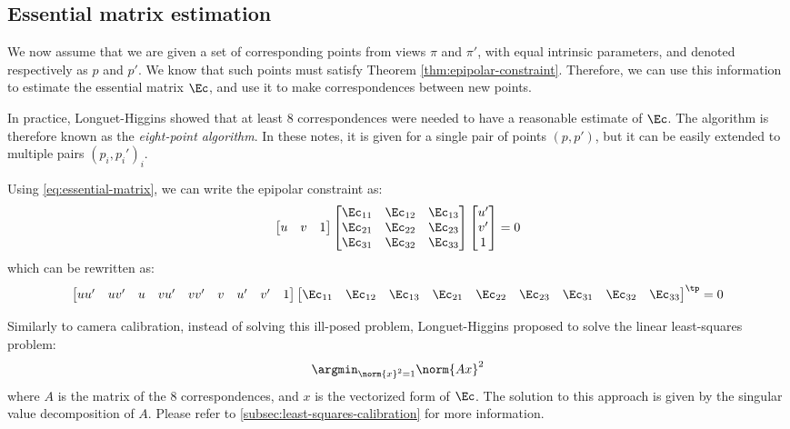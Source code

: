 \subsection{Essential matrix estimation}
We now assume that we are given a set of corresponding points from views $\pi$ and $\pi'$, with equal intrinsic parameters, and denoted respectively as $p$ and $p'$. We know that such points must satisfy Theorem \ref{thm:epipolar-constraint}. Therefore, we can use this information to estimate the essential matrix $\Ec$, and use it to make correspondences between new points.

\begin{remark}
    In practice, Longuet-Higgins showed that at least 8 correspondences were needed to have a reasonable estimate of $\Ec$. The algorithm is therefore known as the \emph{eight-point algorithm}. In these notes, it is given for a single pair of points $(p,p')$, but it can be easily extended to multiple pairs $(p_i,p_i')_i$.
\end{remark}

Using \autoref{eq:essential-matrix}, we can write the epipolar constraint as:
\begin{equation}
    \begin{bmatrix}u&v&1\end{bmatrix}
    \begin{bmatrix}
        \Ec_{11} & \Ec_{12} & \Ec_{13} \\
        \Ec_{21} & \Ec_{22} & \Ec_{23} \\
        \Ec_{31} & \Ec_{32} & \Ec_{33}
    \end{bmatrix}
    \begin{bmatrix}u'\\v'\\1\end{bmatrix}=0
\end{equation}
which can be rewritten as:
\begin{equation*}
    \begin{bmatrix}
        uu' & uv' & u & vu' & vv' & v & u' & v' & 1
    \end{bmatrix}
    \begin{bmatrix}
        \Ec_{11} & \Ec_{12} & \Ec_{13} & \Ec_{21} & \Ec_{22} & \Ec_{23} & \Ec_{31} & \Ec_{32} & \Ec_{33}
    \end{bmatrix}^\tp=0
\end{equation*}

Similarly to camera calibration, instead of solving this ill-posed problem, Longuet-Higgins proposed to solve the linear least-squares problem:
\begin{equation}
    \label{eq:least-squares-essential}
    \argmin_{\norm{x}^2=1} \norm{Ax}^2
\end{equation}
where $A$ is the matrix of the $8$ correspondences, and $x$ is the vectorized form of $\Ec$. The solution to this approach is given by the singular value decomposition of $A$. Please refer to \autoref{subsec:least-squares-calibration} for more information.

